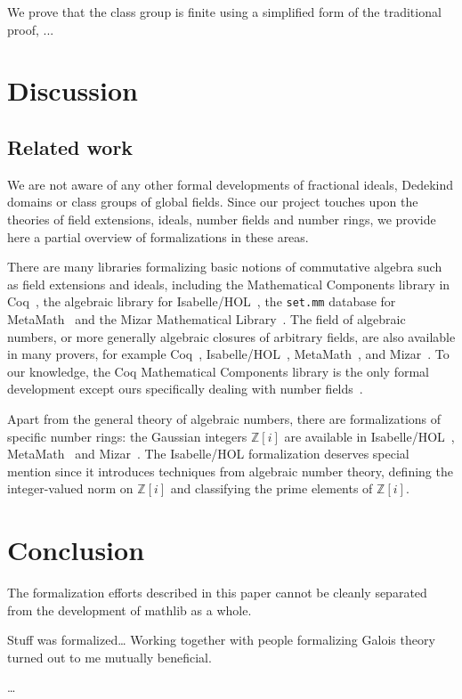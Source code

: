 \documentclass[a4paper,USenglish,cleveref, autoref, thm-restate]{lipics-v2021}
\newcommand{\mathlib}{\textsf{mathlib}\xspace}
\newcommand{\Z}{\mathbb{Z}}
\begin{document}
We prove that the class group is finite using a simplified form of the traditional proof, ...

\section{Discussion}

\subsection{Related work}

We are not aware of any other formal developments of fractional ideals, Dedekind domains or class groups of global fields.
Since our project touches upon the theories of field extensions, ideals, number fields and number rings,
we provide here a partial overview of formalizations in these areas.

There are many libraries formalizing basic notions of commutative algebra such as field extensions and ideals, including the Mathematical Components library in Coq~\cite{mathcomp}, the algebraic library for Isabelle/HOL~\cite{algebra_isabelle}, the \texttt{set.mm} database for MetaMath~\cite{metamath} and the Mizar Mathematical Library~\cite{algebraic-hierarchy_mizar}. The field of algebraic numbers, or more generally algebraic closures of arbitrary fields, are also available in many provers, for example Coq~\cite{real-algebraic-numbers-coq, mathcomp}, Isabelle/HOL~\cite{algebraic-numbers-isabelle}, MetaMath~\cite{algebraic-numbers-metamath}, and Mizar~\cite{algebraic-numbers-mizar}. To our knowledge, the Coq Mathematical Components library is the only formal development except ours specifically dealing with number fields~\cite[\texttt{field/algnum.v}]{mathcomp}.

Apart from the general theory of algebraic numbers, there are formalizations of specific number rings: the Gaussian integers $\Z[i]$ are available in Isabelle/HOL~\cite{gaussian_integers-isabelle}, MetaMath~\cite{gaussian_integers-metamath} and Mizar~\cite{gaussian_integers-mizar}.
The Isabelle/HOL formalization deserves special mention since it introduces techniques from algebraic number theory,
defining the integer-valued norm on $\Z[i]$ and classifying the prime elements of $\Z[i]$.

\section{Conclusion}

The formalization efforts described in this paper cannot be cleanly separated from the development of \mathlib as a whole.

Stuff was formalized\ldots
Working together with people formalizing Galois theory turned out to me mutually beneficial.

\ldots
 



\end{document}
